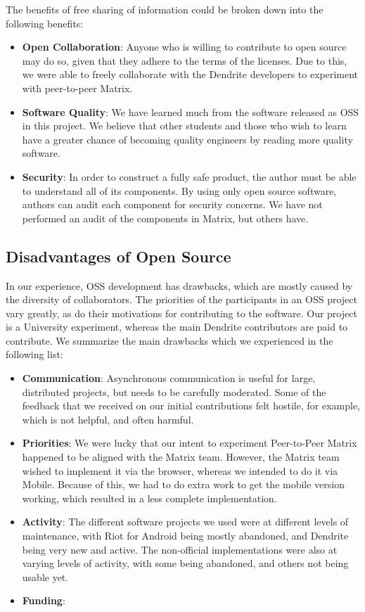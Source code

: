 The benefits of free sharing of information could be broken down into the following benefits:
\begin{itemize}
	\item{
		\textbf{Open Collaboration}:
		Anyone who is willing to contribute to open source may do so, given that they adhere to the terms of the licenses.
		Due to this, we were able to freely collaborate with the Dendrite developers to experiment with peer-to-peer Matrix.
	}
	\item{
		\textbf{Software Quality}:
		We have learned much from the software released as \ac{OSS} in this project.
		We believe that other students and those who wish to learn have a greater chance of becoming quality engineers by reading more quality software.
	}
	\item{
		\textbf{Security}:
		In order to construct a fully safe product, the author must be able to understand all of its components.
		By using only open source software, authors can audit each component for security concerns.
		We have not performed an audit of the components in Matrix, but others have.
	}
\end{itemize}

\subsection{Disadvantages of Open Source}\label{subsec:open_source_disadvantages}
In our experience, \ac{OSS} development has drawbacks, which are mostly caused by the diversity of collaborators.
The priorities of the participants in an \ac{OSS} project vary greatly, as do their motivations for contributing to the software.
Our project is a University experiment, whereas the main Dendrite contributors are paid to contribute.
We summarize the main drawbacks which we experienced in the following list:
\begin{itemize}
	\item{
		\textbf{Communication}:
		Asynchronous communication is useful for large, distributed projects, but needs to be carefully moderated.
		Some of the feedback that we received on our initial contributions felt hostile, for example, which is not helpful, and often harmful.
	}
	\item{
		\textbf{Priorities}:
		We were lucky that our intent to experiment Peer-to-Peer Matrix happened to be aligned with the Matrix team.
		However, the Matrix team wished to implement it via the browser, whereas we intended to do it via Mobile.
		Because of this, we had to do extra work to get the mobile version working, which resulted in a less complete implementation.
	}
	\item{
		\textbf{Activity}:
		The different software projects we used were at different levels of maintenance, with Riot for Android being mostly abandoned, and Dendrite being very new and active.
		The non-official implementations were also at varying levels of activity, with some being abandoned, and others not being usable yet.
	}
	\item{
		\textbf{Funding}:

	}
\end{itemize}


